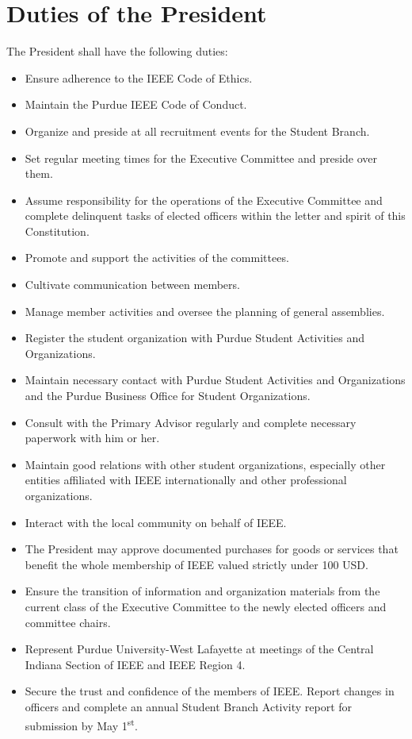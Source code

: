 \documentclass[12pt]{constitution}
\newcommand{\dateannualreportsubmit}{May 1\textsuperscript{st}} %
\begin{document}
\section{Duties of the President}
\label{sec:officer_pres}
The President shall have the following duties:
\begin{itemize}
    \item Ensure adherence to the IEEE Code of Ethics.
    \item Maintain the Purdue IEEE Code of Conduct.
    \item Organize and preside at all recruitment events for the Student Branch.
    \item Set regular meeting times for the Executive Committee and preside over them.
    \item Assume responsibility for the operations of the Executive Committee and complete delinquent tasks of elected officers within the letter and spirit of this Constitution.
    \item Promote and support the activities of the committees.
    \item Cultivate communication between members.
    \item Manage member activities and oversee the planning of general assemblies.
    \item Register the student organization with Purdue Student Activities and Organizations.
    \item Maintain necessary contact with Purdue Student Activities and Organizations and the Purdue Business Office for Student Organizations.
    \item Consult with the Primary Advisor regularly and complete necessary paperwork with him or her.
    \item Maintain good relations with other student organizations, especially other entities affiliated with IEEE internationally and other professional organizations.
    \item Interact with the local community on behalf of IEEE.
    \item The President may approve documented purchases for goods or services that benefit the whole membership of IEEE valued strictly under 100 USD. 
    \item Ensure the transition of information and organization materials from the current class of the Executive Committee to the newly elected officers and committee chairs.
    \item Represent Purdue University-West Lafayette at meetings of the Central Indiana Section of IEEE and IEEE Region 4.
    \item Secure the trust and confidence of the members of IEEE.
    Report changes in officers and complete an annual Student Branch Activity report for submission by \dateannualreportsubmit{}.
\end{itemize}
\end{document}
